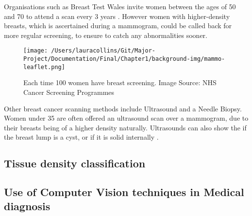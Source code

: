 Organisations such as Breast Test Wales invite women between the ages of 50 and 70 to attend a scan every 3 years \cite{Informed_Choice_about_Cancer_Screening_2013}. However women with higher-density breasts, which is ascertained during a mammogram, could be called back for more regular screening, to ensure to catch any abnormalities sooner.

\begin{figure}[!ht]
  \center
  \texttt{[image: /Users/lauracollins/Git/Major-Project/Documentation/Final/Chapter1/background-img/mammo-leaflet.png]}
  \caption{Each time 100 women have breast screening. Image Source: NHS Cancer Screening Programmes \cite{Informed_Choice_about_Cancer_Screening_2013}}
  \label{fig:mammo-leaflet}
\end{figure}

Other breast cancer scanning methods include Ultrasound and a Needle Biopsy. Women under 35 are often offered an ultrasound scan over a mammogram, due to their breasts being of a higher density naturally. Ultrasounds can also show the if the breast lump is a cyst, or if it is solid internally \cite{Cancer_Research_UK_2015}.

\subsection{Tissue density classification}



\subsection{Use of Computer Vision techniques in Medical diagnosis}
